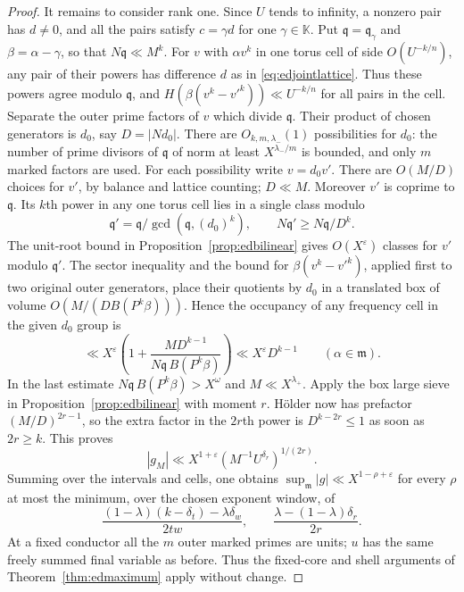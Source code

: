 \documentclass[11pt,letterpaper]{article}
\theoremstyle{definition}
\numberwithin{equation}{section}
\begin{document}
\begin{proof}
It remains to consider rank one. Since $U$ tends to infinity, a
nonzero pair has $d\ne0$, and all the pairs satisfy $c=\gamma d$
for one $\gamma\in\mathbb K$. Put $\mathfrak q=\mathfrak q_\gamma$
and $\beta=\alpha-\gamma$, so that $N\mathfrak q\ll M^k$. For $v$
with $\alpha v^k$ in one torus cell of side $O(U^{-k/n})$, any pair
of their powers has difference $d$ as in \eqref{eq:edjointlattice}.
Thus these powers agree modulo $\mathfrak q$, and
$H(\beta(v^k-v'^k))\ll U^{-k/n}$ for all pairs in the cell.
Separate the outer prime factors of $v$ which divide $\mathfrak q$.
Their product of chosen generators is $d_0$, say $D=|Nd_0|$.
There are $O_{k,m,\lambda_-}(1)$ possibilities for $d_0$: the number
of prime divisors of $\mathfrak q$ of norm at least
$X^{\lambda_-/m}$ is bounded, and only $m$ marked factors are used.
For each possibility write $v=d_0 v'$. There are $O(M/D)$ choices
for $v'$, by balance and lattice counting; $D\ll M$. Moreover $v'$
is coprime to $\mathfrak q$. Its $k$th power in any one torus cell
lies in a single class modulo
\[
    \mathfrak q'=\mathfrak q/\gcd(\mathfrak q,(d_0)^k),
              \qquad N\mathfrak q'\ge N\mathfrak q/D^k .
\]
The unit-root bound in Proposition~\ref{prop:edbilinear} gives
$O(X^\varepsilon)$ classes for $v'$ modulo $\mathfrak q'$.
The sector inequality and the bound for
$\beta(v^k-v'^k)$, applied first to two original outer generators,
place their quotients by $d_0$ in a translated box of volume
$O(M/(D B(P^k\beta)))$. Hence the occupancy of any frequency
cell in the given $d_0$ group is
\[
 \ll X^\varepsilon\!\left(1+
   \frac{M D^{k-1}}{N\mathfrak q\,B(P^k\beta)}\right)
 \ll X^\varepsilon D^{k-1}
         \qquad(\alpha\in\mathfrak m).
\]
In the last estimate $N\mathfrak q\, B(P^k\beta)>X^\omega$ and
$M\ll X^{\lambda_+}$. Apply the box large sieve in
Proposition~\ref{prop:edbilinear} with moment $r$.
H\"older now has prefactor $(M/D)^{2r-1}$, so the extra factor in
the $2r$th power is $D^{k-2r}\le1$ as soon as $2r\ge k$.
This proves
\begin{equation}\label{eq:edsmallasym}
             |g_M|\ll X^{1+\varepsilon}
                     (M^{-1}U^{\delta_r})^{1/(2r)} .
\end{equation}
Summing over the intervals and cells, one obtains
$\sup_{\mathfrak m}|g|\ll X^{1-\rho+\varepsilon}$ for every
$\rho$ at most the minimum, over the chosen exponent window, of
\[
 \frac{(1-\lambda)(k-\delta_t)-\lambda\delta_w}{2tw},
       \qquad \frac{\lambda-(1-\lambda)\delta_r}{2r}.
\]
At a fixed conductor all the $m$ outer marked primes are units;
$u$ has the same freely summed final variable as before. Thus the
fixed-core and shell arguments of Theorem~\ref{thm:edmaximum}
apply without change.


\end{proof}
\end{document}
